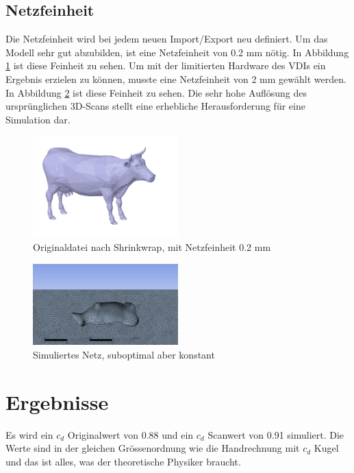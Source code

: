 \documentclass[a4paper,12pt]{article}
\begin{document}
\newpage

\subsection{Netzfeinheit}
Die Netzfeinheit wird bei jedem neuen Import/Export neu definiert. Um das Modell sehr gut abzubilden, ist eine Netzfeinheit von 0.2 mm nötig. In Abbildung \ref{fig:02mesh} ist diese Feinheit zu sehen. Um mit der limitierten Hardware des VDIs ein Ergebnis erzielen zu können, musste eine Netzfeinheit von 2 mm gewählt werden. In Abbildung \ref{fig:netz} ist diese Feinheit zu sehen. Die sehr hohe Auflösung des ursprünglichen 3D-Scans stellt eine erhebliche Herausforderung für eine Simulation dar.

\begin{figure}[h]
    \centering
    \includegraphics[width=0.5\textwidth]{cowremesh.PNG}
    \caption{Originaldatei nach Shrinkwrap, mit Netzfeinheit 0.2 mm}
    \label{fig:02mesh}
\end{figure}

\begin{figure}[h]
    \centering
    \includegraphics[width=0.5\textwidth]{nwtz.PNG}
    \caption{Simuliertes Netz, suboptimal aber konstant}
    \label{fig:netz}
\end{figure}

\newpage
\section{Ergebnisse}
Es wird ein \( c_d \) Originalwert von 0.88 und ein \( c_d \) Scanwert von 0.91 simuliert. Die Werte sind in der gleichen Grössenordnung wie die Handrechnung mit \( c_d \) Kugel und das ist alles, was der theoretische Physiker braucht.
\end{document}
